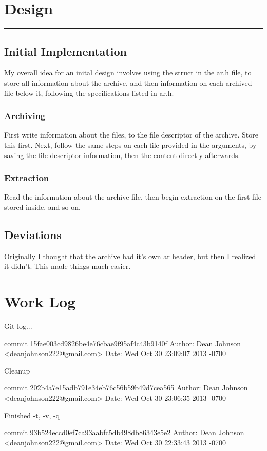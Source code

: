 \documentclass[fleqn,10pt,titlepage]{article}
\begin{document}
\section{Design}
\hrule
\subsection{Initial Implementation}
My overall idea for an inital design involves using the struct in the ar.h file, to store all information about the archive, and then 
information on each archived file below it, following the specifications listed in ar.h.
\subsubsection{Archiving}
First write information about the files, to the file descriptor of the archive. Store this first. Next, follow the same steps on each
file provided in the arguments, by saving the file descriptor information, then the content directly afterwards.

\subsubsection{Extraction}
Read the information about the archive file, then begin extraction on the first file stored inside, and so on.
\subsection{Deviations}
Originally I thought that the archive had it's own ar header, but then I realized it didn't. This made things much easier.
\clearpage

\section{Work Log}
Git log...

commit 15fae003cd9826be4e76cbae9f95af4c43b9140f
Author: Dean Johnson <deanjohnson222@gmail.com>
Date:   Wed Oct 30 23:09:07 2013 -0700

    Cleanup

commit 202b4a7e15adb791e34eb76c56b59b49d7cea565
Author: Dean Johnson <deanjohnson222@gmail.com>
Date:   Wed Oct 30 23:06:35 2013 -0700

    Finished -t, -v, -q

commit 93b524eccd0ef7ca93aabfc5db498db86343e5e2
Author: Dean Johnson <deanjohnson222@gmail.com>
Date:   Wed Oct 30 22:33:43 2013 -0700
\end{document}
